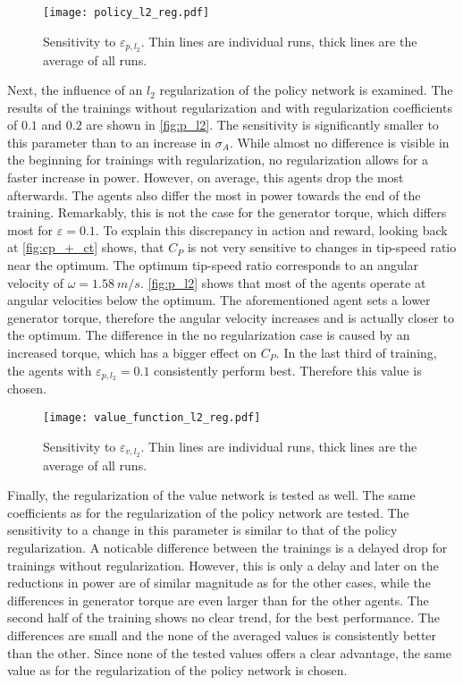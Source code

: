\begin{figure}[h]
	\centering
	\texttt{[image: policy\_l2\_reg.pdf]}
	\caption{Sensitivity to $\varepsilon_{p,l_2}$. Thin lines are individual runs, thick lines are the average of all runs.}
	\label{fig:p_l2}
\end{figure}
Next, the influence of an $l_2$ regularization of the policy network is examined. The results of the trainings without regularization and with regularization coefficients of $0.1$ and $0.2$ are shown in \autoref{fig:p_l2}. The sensitivity is significantly smaller to this parameter than to an increase in $\sigma_A$. While almost no difference is visible in the beginning for trainings with regularization, no regularization allows for a faster increase in power. However, on average, this agents drop the most afterwards. The agents also differ the most in power towards the end of the training. Remarkably, this is not the case for the generator torque, which differs most for $\varepsilon = 0.1$. To explain this discrepancy in action and reward, looking back at \autoref{fig:cp_+_ct} shows, that $C_P$ is not very sensitive to changes in tip-speed ratio near the optimum. The optimum tip-speed ratio corresponds to an angular velocity of $\omega=\SI{1.58}{m/s}$. \autoref{fig:p_l2} shows that most of the agents operate at angular velocities below the optimum. The aforementioned agent sets a lower generator torque, therefore the angular velocity increases and is actually closer to the optimum. The difference in the no regularization case is caused by an increased torque, which has a bigger effect on $C_P$. In the last third of training, the agents with $\varepsilon_{p,l_2}=0.1$ consistently perform best. Therefore this value is chosen. \\
\begin{figure}[h]%
	\centering
	\texttt{[image: value\_function\_l2\_reg.pdf]}
	\caption{Sensitivity to $\varepsilon_{v,l_2}$. Thin lines are individual runs, thick lines are the average of all runs.}
	\label{fig:v_l2}
\end{figure}
Finally, the regularization of the value network is tested as well. The same coefficients as for the regularization of the policy network are tested. The sensitivity to a change in this parameter is similar to that of the policy regularization. A noticable difference between the trainings is a delayed drop for trainings without regularization. However, this is only a delay and later on the reductions in power are of similar magnitude as for the other cases, while the differences in generator torque are even larger than for the other agents. The second half of the training shows no clear trend, for the best performance. The differences are small and the none of the averaged values is consistently better than the other. Since none of the tested values offers a clear advantage, the same value as for the regularization of the policy network is chosen. \\

